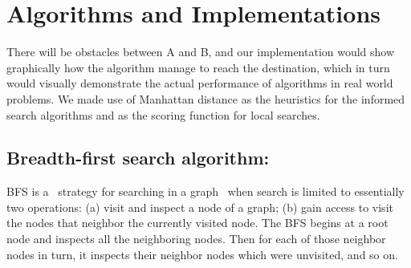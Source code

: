 \documentclass[a4paper]{article}
\begin{document}
 

\section{Algorithms and Implementations}

There will be obstacles between A and B, and our implementation would show graphically how the algorithm manage to reach the destination, which in turn would visually demonstrate the actual performance of algorithms in real world problems. We made use of Manhattan distance as the heuristics for the informed search algorithms and as the scoring function for local searches.


\subsection{Breadth-first search algorithm:}

BFS is a  strategy for searching in a graph  when search is limited to essentially two operations: (a) visit and inspect a node of a graph; (b) gain access to visit the nodes that neighbor the currently visited node. The BFS begins at a root node and inspects all the neighboring nodes. Then for each of those neighbor nodes in turn, it inspects their neighbor nodes which were unvisited, and so on. \\
\end{document}

